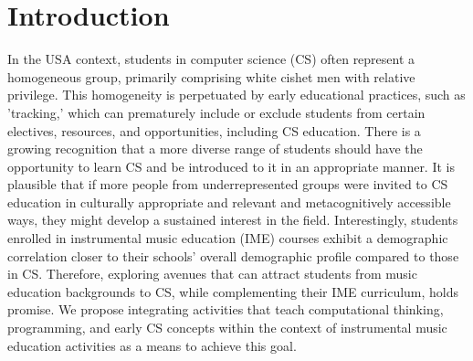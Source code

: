 \documentclass[manuscript,screen,review]{acmart}
\begin{document}

\section{Introduction}
In the USA context, students in computer science (CS) often represent a homogeneous group, primarily comprising white cishet men with relative privilege. This homogeneity is perpetuated by early educational practices, such as 'tracking,' which can prematurely include or exclude students from certain electives, resources, and opportunities, including CS education. There is a growing recognition that a more diverse range of students should have the opportunity to learn CS and be introduced to it in an appropriate manner. It is plausible that if more people from underrepresented groups were invited to CS education in culturally appropriate and relevant and metacognitively accessible ways, they might develop a sustained interest in the field. Interestingly, students enrolled in instrumental music education (IME) courses exhibit a demographic correlation closer to their schools' overall demographic profile compared to those in CS. Therefore, exploring avenues that can attract students from music education backgrounds to CS, while complementing their IME curriculum, holds promise. We propose integrating activities that teach computational thinking, programming, and early CS concepts within the context of instrumental music education activities as a means to achieve this goal.
\end{document}
